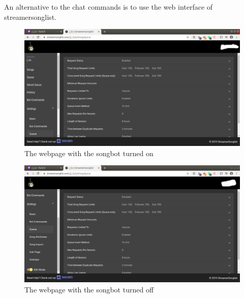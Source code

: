 \newpage

An alternative to the chat commands is to use the web interface of \mbox{streamersonglist}.
\begin{figure}[ht!]
  \includegraphics[width=\linewidth]{src/songbot_on_off/bot_on.png}
  \caption{The webpage with the songbot turned on}
  \label{bot is on}
\end{figure}
\begin{figure}[ht!]
  \includegraphics[width=\linewidth]{src/songbot_on_off/bot_off.png}
  \caption{The webpage with the songbot turned off}
  \label{bot is off}
\end{figure}

